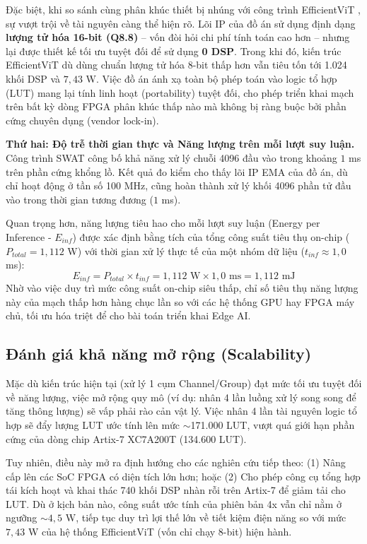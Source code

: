 \documentclass{uetgraduation}
\begin{document}
Đặc biệt, khi so sánh cùng phân khúc thiết bị nhúng với công trình EfficientViT \cite{efficientvit_acc}, sự vượt trội về tài nguyên càng thể hiện rõ. Lõi IP của đồ án sử dụng định dạng \textbf{lượng tử hóa 16-bit (Q8.8)} – vốn đòi hỏi chi phí tính toán cao hơn – nhưng lại được thiết kế tối ưu tuyệt đối để sử dụng \textbf{0 DSP}. Trong khi đó, kiến trúc EfficientViT dù dùng chuẩn lượng tử hóa 8-bit thấp hơn vẫn tiêu tốn tới 1.024 khối DSP và $7,43$ W. Việc đồ án ánh xạ toàn bộ phép toán vào logic tổ hợp (LUT) mang lại tính linh hoạt (portability) tuyệt đối, cho phép triển khai mạch trên bất kỳ dòng FPGA phân khúc thấp nào mà không bị ràng buộc bởi phần cứng chuyên dụng (vendor lock-in).

\textbf{Thứ hai: Độ trễ thời gian thực và Năng lượng trên mỗi lượt suy luận.}
Công trình SWAT \cite{swat_acc} công bố khả năng xử lý chuỗi 4096 đầu vào trong khoảng $1$ ms trên phần cứng khổng lồ. Kết quả đo kiểm cho thấy lõi IP EMA của đồ án, dù chỉ hoạt động ở tần số 100 MHz, cũng hoàn thành xử lý khối 4096 phần tử đầu vào trong thời gian tương đương ($1$ ms). 

Quan trọng hơn, năng lượng tiêu hao cho mỗi lượt suy luận (Energy per Inference - $E_{inf}$) được xác định bằng tích của tổng công suất tiêu thụ on-chip ($P_{total} = 1,112$ W) với thời gian xử lý thực tế của một nhóm dữ liệu ($t_{inf} \approx 1,0$ ms):
\begin{equation}
    E_{inf} = P_{total} \times t_{inf} = 1,112 \text{ W} \times 1,0 \text{ ms} = 1,112 \text{ mJ}
\end{equation}
Nhờ vào việc duy trì mức công suất on-chip siêu thấp, chỉ số tiêu thụ năng lượng này của mạch thấp hơn hàng chục lần so với các hệ thống GPU hay FPGA máy chủ, tối ưu hóa triệt để cho bài toán triển khai Edge AI.

\subsection{Đánh giá khả năng mở rộng (Scalability)}

Mặc dù kiến trúc hiện tại (xử lý 1 cụm Channel/Group) đạt mức tối ưu tuyệt đối về năng lượng, việc mở rộng quy mô (ví dụ: nhân 4 lần luồng xử lý song song để tăng thông lượng) sẽ vấp phải rào cản vật lý. Việc nhân 4 lần tài nguyên logic tổ hợp sẽ đẩy lượng LUT ước tính lên mức $\sim$171.000 LUT, vượt quá giới hạn phần cứng của dòng chip Artix-7 XC7A200T (134.600 LUT). 

Tuy nhiên, điều này mở ra định hướng cho các nghiên cứu tiếp theo: (1) Nâng cấp lên các SoC FPGA có diện tích lớn hơn; hoặc (2) Cho phép công cụ tổng hợp tái kích hoạt và khai thác 740 khối DSP nhàn rỗi trên Artix-7 để giảm tải cho LUT. Dù ở kịch bản nào, công suất ước tính của phiên bản 4x vẫn chỉ nằm ở ngưỡng $\sim 4,5$ W, tiếp tục duy trì lợi thế lớn về tiết kiệm điện năng so với mức $7,43$ W của hệ thống EfficientViT (vốn chỉ chạy 8-bit) hiện hành.
\end{document}
